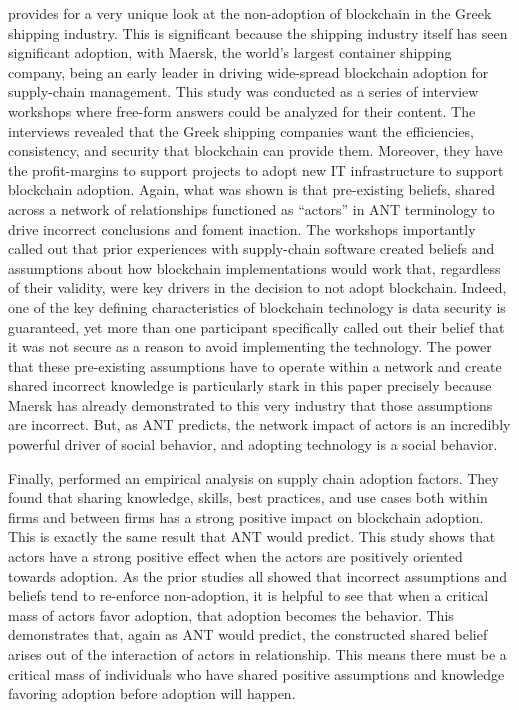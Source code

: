 \textcite{papathanasiouNonApplicationBlockchain2020} provides for a very unique look at the non-adoption of blockchain in the Greek shipping industry. This is significant because the shipping industry itself has seen significant adoption, with Maersk, the world's largest container shipping company, being an early leader in driving wide-spread blockchain adoption for supply-chain management. This study was conducted as a series of interview workshops where free-form answers could be analyzed for their content. The interviews revealed that the Greek shipping companies want the efficiencies, consistency, and security that blockchain can provide them. Moreover, they have the profit-margins to support projects to adopt new IT infrastructure to support blockchain adoption. Again, what was shown is that pre-existing beliefs, shared across a network of relationships functioned as ``actors'' in ANT terminology to drive incorrect conclusions and foment inaction. The workshops importantly called out that prior experiences with supply-chain software created beliefs and assumptions about how blockchain implementations would work that, regardless of their validity, were key drivers in the decision to not adopt blockchain. Indeed, one of the key defining characteristics of blockchain technology is data security is guaranteed, yet more than one participant specifically called out their belief that it was not secure as a reason to avoid implementing the technology. The power that these pre-existing assumptions have to operate within a network and create shared incorrect knowledge is particularly stark in this paper precisely because Maersk has already demonstrated to this very industry that those assumptions are incorrect. But, as ANT predicts, the network impact of actors is an incredibly powerful driver of social behavior, and adopting technology is a social behavior.

Finally, \textcite{fossowambaDynamicsBlockchainAdoption2020} performed an empirical analysis on supply chain adoption factors. They found that sharing knowledge, skills, best practices, and use cases both within firms and between firms has a strong positive impact on blockchain adoption. This is exactly the same result that ANT would predict. This study shows that actors have a strong positive effect when the actors are positively oriented towards adoption. As the prior studies all showed that incorrect assumptions and beliefs tend to re-enforce non-adoption, it is helpful to see that when a critical mass of actors favor adoption, that adoption becomes the behavior. This demonstrates that, again as ANT would predict, the constructed shared belief arises out of the interaction of actors in relationship. This means there must be a critical mass of individuals who have shared positive assumptions and knowledge favoring adoption before adoption will happen.

